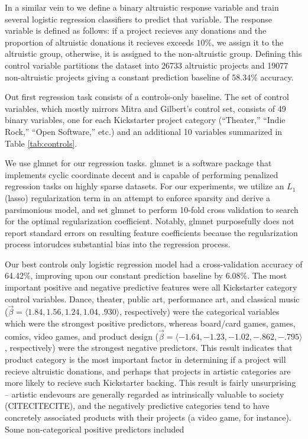 \documentclass[letterpaper]{article}
\begin{document}
In a similar vein to \cite{mitra2014language} we define a binary altruistic response variable and train several logistic regression classifiers to predict that variable. The response variable is defined as follows: if a project recieves any donations and the proportion of altruistic donations it recieves exceeds $10\%$, we assign it to the altruistic group, otherwise, it is assigned to the non-altruistic group. Defining this control variable partitions the dataset into 26733 altruistic projects and 19077 non-altruistic projects giving a constant prediction baseline of 58.34\% accuracy.

Out first regression task consists of a controls-only baseline. The set of control variables, which mostly mirrors Mitra and Gilbert's control set, consists of 49 binary variables, one for each Kickstarter project category (``Theater,'' ``Indie Rock,'' ``Open Software,'' etc.) and an additional 10 variables summarized in Table \ref{tab:controls}.

We use glmnet \cite{friedman2010glmnet} for our regression tasks. glmnet is a software package that implements cyclic coordinate decent and is capable of performing penalized regression tasks on highly sparse datasets. For our experiments, we utilize an $L_1$ (lasso) regularization term in an attempt to enforce sparsity and derive a parsimonious model, and set glmnet to perform 10-fold cross validation to search for the optimal regularization coefficient. Notably, glmnet purposefully does not report standard errors on resulting feature coefficients because the regularization process intorudces substantial bias into the regression process.

Our best controls only logistic regression model had a cross-validation accuracy of 64.42\%, improving upon our constant prediction baseline by 6.08\%. The most important positive and negative predictive features were all Kickstarter category control variables. Dance, theater, public art, performance art, and classical music ($\vec{\beta} = \langle 1.84, 1.56, 1.24, 1.04, .930 \rangle$, respectively) were the categorical variables which were the strongest positive predictors, whereas board/card games, games, comics, video games, and product design ($\vec{\beta} = \langle -1.64, -1.23, -1.02, -.862, -.795 \rangle$, respectively) were the strongest negative predictors. This result indicates that product category is the most important factor in determining if a project will recieve altruistic donations, and perhaps that projects in artistic categories are more likely to recieve such Kickstarter backing. This result is fairly unsurprising -- artistic endevours are generally regarded as intrinsically valuable to society (CITECITECITE), and the negatively predictive categories tend to have concretely associated products with their projects (a video game, for instance). Some non-categorical positive predictors included
\end{document}
